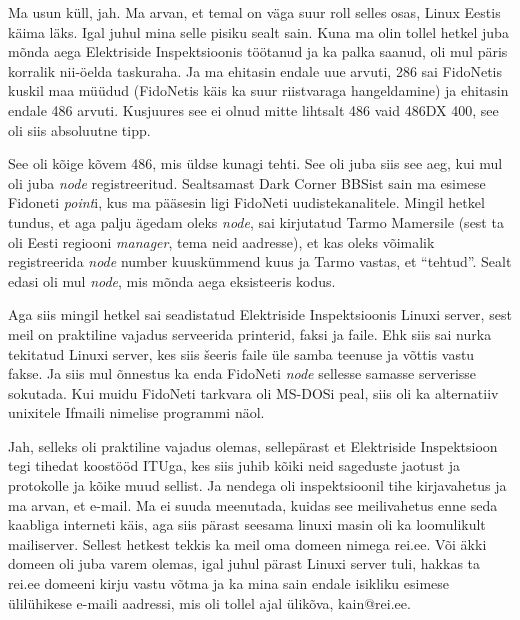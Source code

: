 
Ma usun küll, jah. Ma arvan, et temal on väga suur roll selles osas, Linux Eestis käima läks. Igal juhul mina selle pisiku sealt sain. Kuna ma olin tollel hetkel juba mõnda aega Elektriside Inspektsioonis töötanud ja ka palka saanud, oli mul päris korralik nii-öelda  taskuraha. Ja ma ehitasin  endale uue arvuti, 286 sai FidoNetis  kuskil maa müüdud (FidoNetis  käis ka suur riistvaraga hangeldamine) ja ehitasin endale 486 arvuti. Kusjuures see ei olnud mitte lihtsalt 486 vaid 486DX 400, see oli siis absoluutne tipp. 

See oli kõige kõvem 486, mis üldse kunagi tehti. See oli  juba siis see aeg, kui mul oli juba \emph{node} registreeritud. Sealtsamast Dark Corner BBSist sain ma esimese Fidoneti \emph{point}i, kus ma pääsesin ligi FidoNeti uudistekanalitele. Mingil hetkel tundus, et aga palju ägedam oleks \emph{node}, sai kirjutatud Tarmo Mamersile (sest ta oli Eesti regiooni \emph{manager}, tema neid aadresse), et kas oleks võimalik registreerida \emph{node} number kuuskümmend kuus ja Tarmo vastas, et \enquote{tehtud}. Sealt edasi oli mul \emph{node}, mis mõnda aega eksisteeris kodus. 

Aga siis mingil hetkel sai seadistatud Elektriside Inspektsioonis Linuxi server, sest meil on praktiline vajadus serveerida printerid, faksi ja faile. Ehk siis sai nurka tekitatud Linuxi server, kes siis šeeris faile üle samba teenuse ja võttis vastu fakse. Ja siis mul õnnestus ka enda FidoNeti \emph{node} sellesse samasse serverisse sokutada. Kui muidu FidoNeti tarkvara oli MS-DOSi peal, siis  oli ka alternatiiv unixitele Ifmaili nimelise programmi näol.


Jah, selleks oli praktiline vajadus  olemas, sellepärast et Elektriside Inspektsioon tegi tihedat koostööd ITUga, kes siis juhib kõiki neid sageduste jaotust ja protokolle ja  kõike muud sellist. Ja nendega oli inspektsioonil tihe kirjavahetus ja ma arvan, et e-mail. Ma ei suuda meenutada, kuidas see meilivahetus enne seda kaabliga interneti käis, aga siis pärast  seesama linuxi masin oli ka loomulikult mailiserver. Sellest hetkest tekkis ka meil oma domeen nimega rei.ee. Või äkki domeen oli juba varem olemas, igal juhul pärast Linuxi server tuli, hakkas ta rei.ee domeeni  kirju vastu võtma ja ka mina sain endale isikliku esimese ülilühikese e-maili aadressi, mis oli tollel ajal ülikõva, kain@rei.ee.

